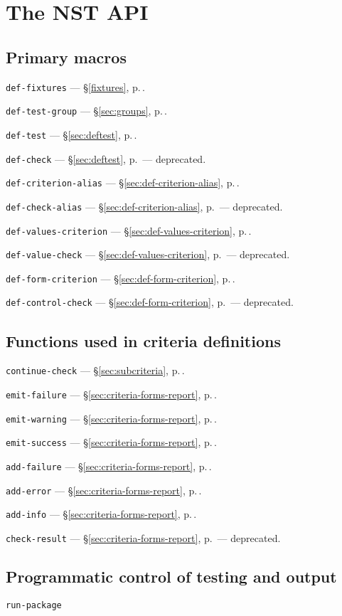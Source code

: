 
\section{The NST API}
\def\secpageref#1{ --- \S\ref{#1}, p.\,\pageref{#1}}

\subsection{Primary macros}
\texttt{def-fixtures}\secpageref{fixtures}.

\texttt{def-test-group}\secpageref{sec:groups}.

\texttt{def-test}\secpageref{sec:deftest}.

\texttt{def-check}\secpageref{sec:deftest} --- deprecated.

\texttt{def-criterion-alias}\secpageref{sec:def-criterion-alias}.

\texttt{def-check-alias}\secpageref{sec:def-criterion-alias} ---
deprecated.

\texttt{def-values-criterion}\secpageref{sec:def-values-criterion}.

\texttt{def-value-check}\secpageref{sec:def-values-criterion} ---
deprecated.

\texttt{def-form-criterion}\secpageref{sec:def-form-criterion}.

\texttt{def-control-check}\secpageref{sec:def-form-criterion} ---
deprecated.

\subsection{Functions used in criteria definitions}
\texttt{continue-check}\secpageref{sec:subcriteria}.

\texttt{emit-failure}\secpageref{sec:criteria-forms-report}.

\texttt{emit-warning}\secpageref{sec:criteria-forms-report}.

\texttt{emit-success}\secpageref{sec:criteria-forms-report}.

\texttt{add-failure}\secpageref{sec:criteria-forms-report}.

\texttt{add-error}\secpageref{sec:criteria-forms-report}.

\texttt{add-info}\secpageref{sec:criteria-forms-report}.

\texttt{check-result}\secpageref{sec:criteria-forms-report} ---
deprecated.

\subsection{Programmatic control of testing and output}
\texttt{run-package}

